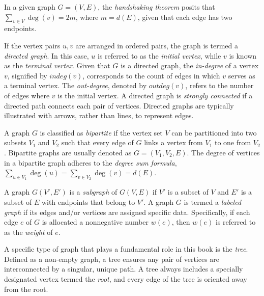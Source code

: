 \begin{example}
In a given graph $G=(V,E)$, the \emph{handshaking theorem} posits that $\sum_{v \in V} \deg(v) = 2m$, where $m = d(E)$, given that each edge has two endpoints.
\end{example}

If the vertex pairs $u, v$ are arranged in ordered pairs, the graph is termed a \emph{directed graph}. In this case, $u$ is referred to as the \emph{initial vertex}, while $v$ is known as the \emph{terminal vertex}. Given that $G$ is a directed graph, the \emph{in-degree} of a vertex $v$, signified by $indeg(v)$, corresponds to the count of edges in which $v$ serves as a terminal vertex. The \emph{out-degree}, denoted by $outdeg(v)$, refers to the number of edges where $v$ is the initial vertex. A directed graph is \emph{strongly connected} if a directed path connects each pair of vertices. Directed graphs are typically illustrated with arrows, rather than lines, to represent edges.

A graph $G$ is classified as \emph{bipartite} if the vertex set $V$ can be partitioned into two subsets $V_1$ and $V_2$ such that every edge of $G$ links a vertex from $V_1$ to one from $V_2$. Bipartite graphs are usually denoted as $G=(V_1, V_2, E)$. The degree of vertices in a bipartite graph adheres to the \emph{degree sum formula}, $\sum_{u \in V_1} \deg(u) = \sum_{v \in V_2} \deg(v) = d(E)$.

A graph $G(V',E')$ is a \emph{subgraph} of $G(V,E)$ if $V'$ is a subset of $V$ and $E'$ is a subset of $E$ with endpoints that belong to $V'$. A graph $G$ is termed a \emph{labeled graph} if its edges and/or vertices are assigned specific data. Specifically, if each edge $e$ of $G$ is allocated a nonnegative number $w(e)$, then $w(e)$ is referred to as the \emph{weight} of $e$.

A specific type of graph that plays a fundamental role in this book is the \emph{tree}. Defined as a non-empty graph, a tree ensures any pair of vertices are interconnected by a singular, unique path. A tree always includes a specially designated vertex termed the \emph{root}, and every edge of the tree is oriented away from the root.

